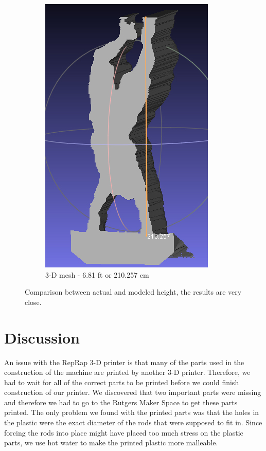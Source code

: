 \documentclass[pdftex,10.5pt]{report}
\begin{document}
\begin{figure}[H]
\begin{subfigure}[H]{0.4\textwidth}
		\includegraphics[width=\textwidth]{figures/ryanhandstandmeasure}
		\caption{3-D mesh - 6.81 ft or 210.257 cm}
	\end{subfigure}
	\caption{Comparison between actual and modeled height, the results are very close.}
	\label{fig:sizes}
\end{figure}

\section{Discussion}
An issue with the RepRap 3-D printer is that many of the parts used in the construction of the machine are printed by another 3-D printer. Therefore, we had to wait for all of the correct parts to be printed before we could finish construction of our printer. We discovered that two important parts were missing and therefore we had to go to the Rutgers Maker Space to get these parts printed. The only problem we found with the printed parts was that the holes in the plastic were the exact diameter of the rods that were supposed to fit in. Since forcing the rods into place might have placed too much stress on the plastic parts, we use hot water to make the printed plastic more malleable.
\end{document}
